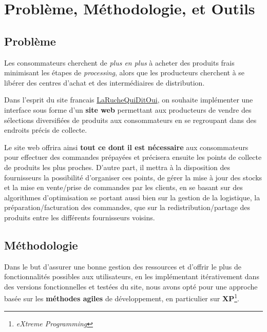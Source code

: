 \documentclass[a4paper,12pt]{report}
\theoremstyle{break}
\theoremstyle{break}
\theoremstyle{break}
\theoremstyle{break}
\theoremstyle{definition}
\theoremstyle{remark}
\begin{document}
\chapter{Problème, Méthodologie, et Outils}
\section{Problème}
Les consommateurs cherchent de \textit{plus en plus} à acheter des produits frais minimisant les étapes de \textit{processing}, alors que les producteurs cherchent à se libérer des centres d’achat et des intermédiaires de distribution.

Dans l’esprit du site francais \href{https://laruchequiditoui.fr/fr}{LaRucheQuiDitOui}, on souhaite implémenter une interface sous forme d'un \textbf{site web} permettant aux producteurs de vendre des sélections diversifiées de produits aux consommateurs en se regroupant dans des endroits précis de collecte.

Le site web offrira ainsi \textbf{tout ce dont il est nécessaire} aux consommateurs pour effectuer des commandes prépayées et précisera ensuite les points de collecte de produits les plus proches. D'autre part, il mettra à la disposition des fournisseurs la possibilité d'organiser ces points, de gérer la mise à jour des stocks et la mise en vente/prise de commandes par les clients, en se basant sur des algorithmes d'optimisation se portant aussi bien sur la gestion de la logistique, la préparation/facturation des commandes, que sur la redistribution/partage des produits entre les différents fournisseurs voisins.
\section{Méthodologie}
Dans le but d'assurer une bonne gestion des ressources et d'offrir le plus de fonctionnalités possibles aux utilisateurs, en les implémentant itérativement dans des versions fonctionnelles et testées du site, nous avons opté pour une approche basée sur les \textbf{méthodes agiles} de développement, en particulier sur \textbf{XP}\footnote{\textit{eXtreme Programming}}.
\end{document}
